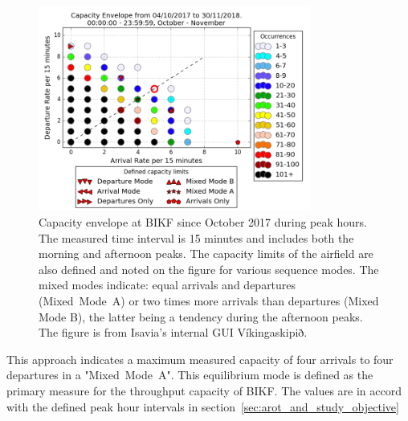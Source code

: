 \begin{figure}[h]
    \centering
    \includegraphics[width=0.8\textwidth]{graphics/fig_Capacity_Envelope_2017-10-04_to_2018-11-30_15min_occurrences_limits.png}
    \caption[Capacity envelope for BIKF]{Capacity envelope at BIKF since October 2017 during peak hours. The measured time interval is 15 minutes and includes both the morning and afternoon peaks. The capacity limits of the airfield are also defined and noted on the figure for various sequence modes. The mixed modes indicate: equal arrivals and departures (Mixed~Mode~A) or two times more arrivals than departures (Mixed Mode B), the latter being a tendency during the afternoon peaks. The figure is from Isavia's internal GUI Víkingaskipið.}  \label{fig:capacity_evnelope}
\end{figure}

This approach indicates a maximum measured capacity of four arrivals to four departures in a "Mixed~Mode~A". This equilibrium mode is defined as the primary measure for the throughput capacity of BIKF. The values are in accord with the defined peak hour intervals in section~\ref{sec:arot_and_study_objective}

